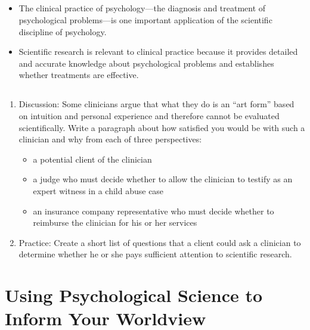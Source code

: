 \subsection{}
\begin{fullwidth}
\begin{itemize}
\item The clinical practice of psychology—the diagnosis and treatment of psychological problems—is one important application of the scientific discipline of psychology.
\item Scientific research is relevant to clinical practice because it provides detailed and accurate knowledge about psychological problems and establishes whether treatments are effective.
\end{itemize}
\end{fullwidth}

\subsection{}
\begin{fullwidth}
\begin{enumerate}
\item Discussion: Some clinicians argue that what they do is an “art form” based on intuition and personal experience and therefore cannot be evaluated scientifically. Write a paragraph about how satisfied you would be with such a clinician and why from each of three perspectives:
\begin{itemize}
\item a potential client of the clinician
\item a judge who must decide whether to allow the clinician to testify as an expert witness in a child abuse case
\item an insurance company representative who must decide whether to reimburse the clinician for his or her services
\end{itemize}
\item Practice: Create a short list of questions that a client could ask a clinician to determine whether he or she pays sufficient attention to scientific research.
\end{enumerate}
\end{fullwidth}

\section{Using Psychological Science to Inform Your Worldview}

